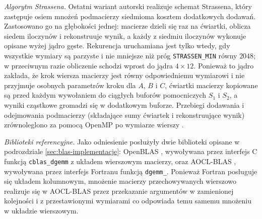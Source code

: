 \documentclass[a4paper,12pt]{book} %
\begin{document}
\emph{Algorytm Strassena.} Ostatni wariant autorski realizuje schemat Strassena, który zastępuje osiem mnożeń podmacierzy siedmioma kosztem dodatkowych dodawań. Zastosowano go na głębokości jednej: macierze dzieli się raz na ćwiartki, oblicza siedem iloczynów i rekonstruuje wynik, a każdy z siedmiu iloczynów wykonuje opisane wyżej jądro gęste. Rekurencja uruchamiana jest tylko wtedy, gdy wszystkie wymiary są parzyste i nie mniejsze niż próg \texttt{STRASSEN\_MIN} równy $2048$; w przeciwnym razie obliczenie schodzi wprost do jądra $4 \times 12$. Ponieważ to jądro zakłada, że krok wiersza macierzy jest równy odpowiedniemu wymiarowi i nie przyjmuje osobnych parametrów kroku dla $A$, $B$ i $C$, ćwiartki macierzy kopiowane są przed każdym wywołaniem do ciągłych buforów pomocniczych $S_1$ i $S_2$, a wyniki cząstkowe gromadzi się w dodatkowym buforze. Przebiegi dodawania i odejmowania podmacierzy (składające sumy ćwiartek i rekonstruujące wynik) zrównoleglono za pomocą OpenMP po wymiarze wierszy \cite{openmp52}.

\emph{Biblioteki referencyjne.} Jako odniesienie posłużyły dwie biblioteki opisane w podrozdziale \ref{sec:blas-implementacje}: OpenBLAS \cite{zhang2012openblas}, wywoływana przez interfejs C funkcją \texttt{cblas\_dgemm} z układem wierszowym macierzy, oraz AOCL-BLAS \cite{amd_aocl_blas}, wywoływana przez interfejs Fortranu funkcją \texttt{dgemm\_}. Ponieważ Fortran posługuje się układem kolumnowym, mnożenie macierzy przechowywanych wierszowo realizuje się w AOCL-BLAS przez przekazanie argumentów w zamienionej kolejności i z przestawionymi wymiarami co odpowiada temu samemu mnożeniu w układzie wierszowym.
\end{document}
